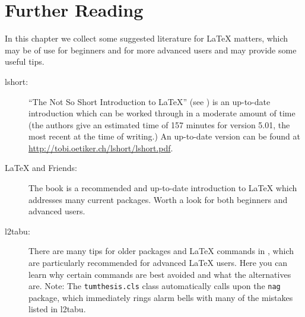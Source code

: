 
\chapter{Further Reading}
\label{ch:reader}

In this chapter we collect some suggested literature for \LaTeX{} matters, which may be of use for beginners and for more advanced users and may provide some useful tips.


\begin{description}
\item[lshort:] \enquote{The Not So Short Introduction to \LaTeX}
  (see \cite{l2short}) is an up-to-date introduction which can be worked through in a moderate amount of time (the authors give an estimated time of 157 minutes for version 5.01, the most recent at the time of writing.) An up-to-date version can be found at \url{http://tobi.oetiker.ch/lshort/lshort.pdf}.

\item[\LaTeX{} and Friends:] The book \cite{vanDongen2012} is a recommended and up-to-date introduction to \LaTeX{} which addresses many current packages. Worth a look for both beginners and advanced users.


\item[l2tabu:] There are many tips for older packages and \LaTeX{} commands in \cite{l2tabu}, which are particularly recommended for advanced \LaTeX{} users. Here you can learn why certain commands are best avoided and what the alternatives are. Note: The \texttt{tumthesis.cls} class automatically calls upon the \texttt{nag} package, which immediately rings alarm bells with many of the mistakes listed in l2tabu.


\end{description}

